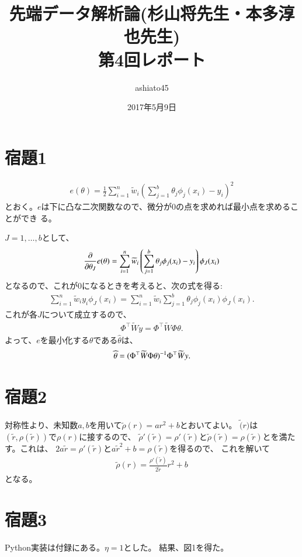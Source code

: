 \documentclass[9pt]{ltjsarticle}
\title{先端データ解析論(杉山将先生・本多淳也先生)\\第4回レポート}
\author{ashiato45}
\date{2017年5月9日}
\begin{document}
\maketitle

\section*{宿題1}
\begin{align}
 e(\theta) = \frac{1}{2}\sum_{i=1}^n \tilde w_i 
\left(\sum_{j=1}^b \theta_j \phi_j(x_i) - y_i\right)^2
\end{align}
とおく。$e$は下に凸な二次関数なので、微分が0の点を求めれば最小点を求めることができ
る。

$J=1,\dots,b$として、
\begin{align}
 \frac{\partial}{\partial \theta_J}e(\theta) = 
\sum_{i=1}^n \widetilde w_i \left(\sum_{j=1}^b \theta_j\phi_j(x_i)-y_i\right)\phi_J(x_i)
\end{align}
となるので、これが0になるときを考えると、次の式を得る:
\begin{align}
 \sum_{i=1}^n \tilde w_i y_i \phi_J(x_i) = \sum_{i=1}^n \tilde w_i \sum_{j=1}^b \theta_j \phi_j(x_i)\phi_J(x_i).
\end{align}
これが各$J$について成立するので、
\begin{align}
 \Phi^\top \tilde W y = \Phi^\top \tilde W \Phi \theta.
\end{align}
よって、$e$を最小化する$\theta$である$\hat \theta$は、
\begin{align}
 \widehat \theta = (\Phi^\top \widetilde W \Phi \theta)^{-1} \Phi^\top \widetilde W y.
\end{align}


\section*{宿題2}
対称性より、未知数$a,b$を用いて$\tilde \rho(r)=ar^2+b$とおいてよい。
$\tilde(r)$は$(\tilde r, \rho(\tilde r))$で$\rho(r)$に接するので、
$\tilde \rho'(\tilde r)=\rho'(\tilde r)$と$\tilde \rho(\tilde
r)=\rho(\tilde r)$とを満たす。これは、
$2a\tilde r = \rho'(\tilde r)$と$a\tilde r^2+b=\rho(\tilde r)$を得るので、
これを解いて
\begin{align}
 \tilde \rho(r) = \frac{\rho'(\tilde r)}{2\tilde r}r^2 + b
\end{align}
となる。

\section*{宿題3}
Python実装は付録にある。$\eta = 1$とした。
結果、図1を得た。
\end{document}
